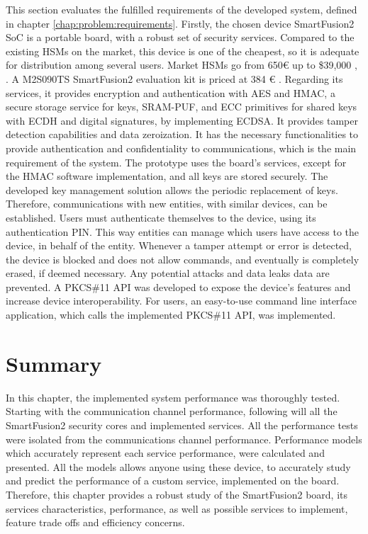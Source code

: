 This section evaluates the fulfilled requirements of the developed system, defined in chapter \ref{chap:problem:requirements}.
Firstly, the chosen device SmartFusion2 SoC is a portable board, with a robust set of security services.
Compared to the existing HSMs on the market, this device is one of the cheapest, so it is adequate for distribution among several users. Market HSMs go from 650€ up to \$39,000 \cite{HSMpriceArticles}, \cite{HSMPresentationPrices}. A M2S090TS SmartFusion2 evaluation kit is priced at 384 € \cite{smartfusionPrice}.
Regarding its services, it provides encryption and authentication with AES and HMAC, a secure storage service for keys, SRAM-PUF, and ECC primitives for shared keys with ECDH and digital signatures, by implementing ECDSA. It provides tamper detection capabilities and data zeroization.
It has the necessary functionalities to provide authentication and confidentiality to communications, which is the main requirement of the system.
The prototype uses the board's services, except for the HMAC software implementation, and all keys are stored securely.
The developed key management solution allows the periodic replacement of keys. Therefore, communications with new entities, with similar devices, can be established.
Users must authenticate themselves to the device, using its authentication PIN. This way entities can manage which users have access to the device, in behalf of the entity.
Whenever a tamper attempt or error is detected, the device is blocked and does not allow commands, and eventually is completely erased, if deemed necessary. Any potential attacks and data leaks data are prevented.
A PKCS\#11 API was developed to expose the device's features and increase device interoperability. For users, an easy-to-use command line interface application, which calls the implemented PKCS\#11 API, was implemented.

\section*{Summary}\label{chap:evaluation:summary}

In this chapter, the implemented system performance was thoroughly tested. Starting with the communication channel performance, following will all the SmartFusion2 security cores and implemented services. All the performance tests were isolated from the communications channel performance. Performance models which accurately represent each service performance, were calculated and presented. All the models allows anyone using these device, to accurately study and predict the performance of a custom service, implemented on the board. Therefore, this chapter provides a robust study of the SmartFusion2 board, its services characteristics, performance, as well as possible services to implement, feature trade offs and efficiency concerns.
